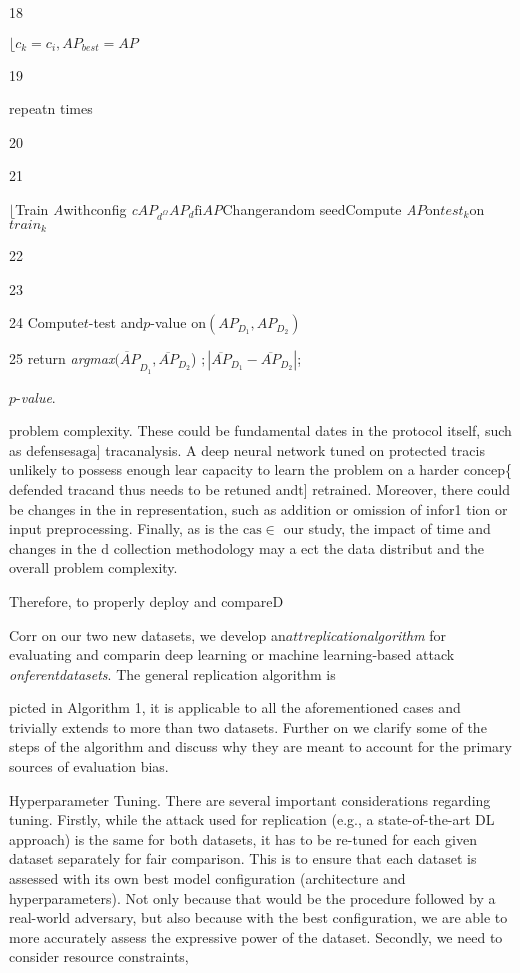 \documentclass[a4paper,12pt]{article}
\begin{document}
18

$\lfloor c_{k}=c_{i},AP_{best}=AP$

19

repeatn times

20

21

$\lfloor$Train {\it A}withconfig {\it c}$AP_{d^{\Omega}}AP_{d}\mathrm{fi}A${\it P}Changerandom seedCompute {\it A}$P\mathrm{on}test_{k}$on$train_{k}$

22

23

24 Compute$t$-test and$p$-value on$(AP_{D_{1}},AP_{D_{2}})$

25 return {\it argmax}$\overline{(AP}_{D_{1}}, \overline{AP}_{D_{2}}$) $;|\overline{AP}_{D_{1}}-\overline{AP}_{D_{2}}|$;

$p$-{\it value}.

problem complexity. These could be fundamental dates in the protocol itself, such as defenses$\mathrm{aga}$] tra$\mathrm{c}$analysis. A deep neural network tuned on protected tra$\mathrm{c}$is unlikely to possess enough lear capacity to learn the problem on a harder concep\{ defended tra$\mathrm{c}$and thus needs to be retuned and$\mathrm{t}$] retrained. Moreover, there could be changes in the in representation, such as addition or omission of infor1 tion or input preprocessing. Finally, as is the $\mathrm{cas}\in$ our study, the impact of time and changes in the d collection methodology may a ect the data distribut and the overall problem complexity.

Therefore, to properly deploy and compare$\mathrm{D}$

Corr on our two new datasets, we develop an$att${\it replication}{\it algorithm} for evaluating and comparin deep learning or machine learning-based attack {\it on}{\it ferent}{\it datasets}. The general replication algorithm is

picted in Algorithm 1, it is applicable to all the aforementioned cases and trivially extends to more than two datasets. Further on we clarify some of the steps of the algorithm and discuss why they are meant to account for the primary sources of evaluation bias.

Hyperparameter Tuning. There are several important considerations regarding tuning. Firstly, while the attack used for replication (e.g., a state-of-the-art DL approach) is the same for both datasets, it has to be re-tuned for each given dataset separately for fair comparison. This is to ensure that each dataset is assessed with its own best model configuration (architecture and hyperparameters). Not only because that would be the procedure followed by a real-world adversary, but also because with the best configuration, we are able to more accurately assess the expressive power of the dataset. Secondly, we need to consider resource constraints,
\end{document}
